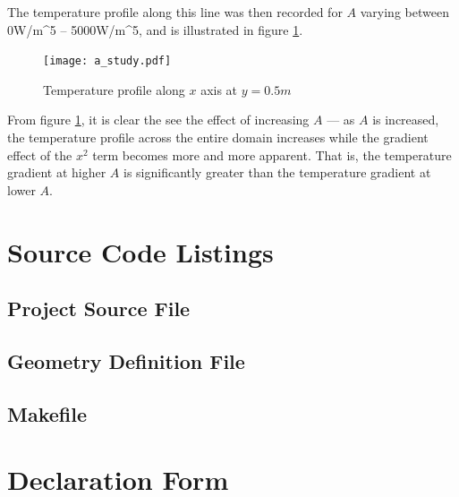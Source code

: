 \documentclass[letterpaper,10pt]{article}
\begin{document}
The temperature profile along this line was then recorded for $A$ varying between \unit{0}{W/m^5} -- \unit{5000}{W/m^5}, and is illustrated in figure \ref{fig:a_study}.

\begin{figure}[H]
	\centering
	\texttt{[image: a\_study.pdf]}
	\caption{Temperature profile along $x$ axis at $y=\unit{0.5}{m}$}
	\label{fig:a_study}
\end{figure}

From figure \ref{fig:a_study}, it is clear the see the effect of increasing $A$ --- as $A$ is increased, the temperature profile across the entire domain increases while the gradient effect of the $x^2$ term becomes more and more apparent. That is, the temperature gradient at higher $A$ is significantly greater than the temperature gradient at lower $A$.

\pagebreak
\appendix
\addappheadtotoc
\makeatletter
\def\@seccntformat#1{Appendix\ \csname the#1\endcsname:\ }
\makeatother
\renewcommand{\thepage}{\thesection-\arabic{page}}
\setcounter{page}{1}

\section{Source Code Listings}
\label{app:source}
\subsection{Project Source File}

\subsection{Geometry Definition File}

\subsection{Makefile}


\pagebreak
\section{Declaration Form}
\begin{center}
{%
\setlength{\fboxsep}{0pt}%
\setlength{\fboxrule}{1pt}%
%
}%
\end{center}
\end{document}
